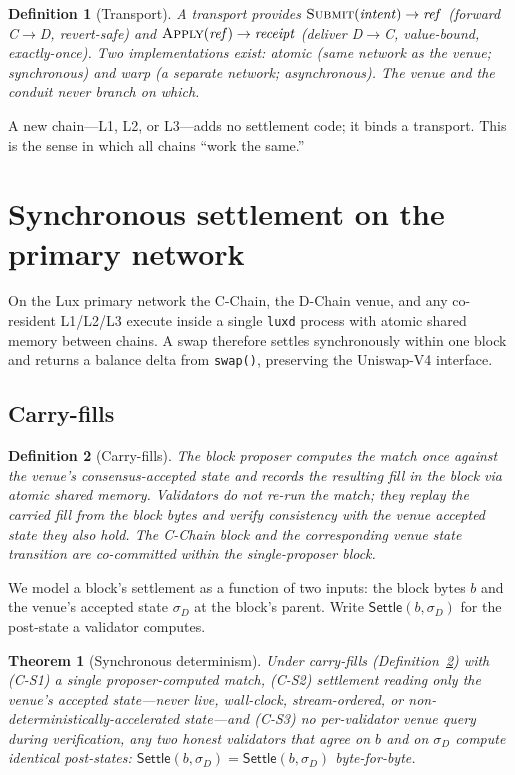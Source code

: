 \documentclass[11pt,a4paper]{article}
\newtheorem{theorem}{Theorem}[section]
\newtheorem{definition}{Definition}[section]
\begin{document}
\begin{definition}[Transport]
A \emph{transport} provides $\textsc{Submit}(\mathit{intent}) \to \mathit{ref}$ (forward C$\to$D,
revert-safe) and $\textsc{Apply}(\mathit{ref}) \to \mathit{receipt}$ (deliver D$\to$C, value-bound,
exactly-once). Two implementations exist: \emph{atomic} (same network as the venue; synchronous)
and \emph{warp} (a separate network; asynchronous). The venue and the conduit never branch on which.
\end{definition}

A new chain---L1, L2, or L3---adds no settlement code; it binds a transport. This is the sense in
which all chains ``work the same.''

\section{Synchronous settlement on the primary network}
\label{sec:sync}

On the Lux primary network the C-Chain, the D-Chain venue, and any co-resident L1/L2/L3 execute
inside a single \texttt{luxd} process with atomic shared memory between chains. A swap therefore
settles synchronously within one block and returns a balance delta from \texttt{swap()}, preserving
the Uniswap-V4 interface.

\subsection{Carry-fills}

\begin{definition}[Carry-fills]\label{def:carry}
The block proposer computes the match \emph{once} against the venue's consensus-accepted state and
records the resulting fill in the block via atomic shared memory. Validators do not re-run the
match; they replay the carried fill from the block bytes and verify consistency with the venue
accepted state they also hold. The C-Chain block and the corresponding venue state transition are
co-committed within the single-proposer block.
\end{definition}

We model a block's settlement as a function of two inputs: the block bytes $b$ and the venue's
accepted state $\sigma_D$ at the block's parent. Write $\mathsf{Settle}(b,\sigma_D)$ for the
post-state a validator computes.

\begin{theorem}[Synchronous determinism]\label{thm:determinism}
Under carry-fills (Definition~\ref{def:carry}) with (C-S1) a single proposer-computed match,
(C-S2) settlement reading only the venue's accepted state---never live, wall-clock, stream-ordered,
or non-deterministically-accelerated state---and (C-S3) no per-validator venue query during
verification, any two honest validators that agree on $b$ and on $\sigma_D$ compute identical
post-states: $\mathsf{Settle}(b,\sigma_D)=\mathsf{Settle}(b,\sigma_D)$ byte-for-byte.
\end{theorem}
\end{document}
